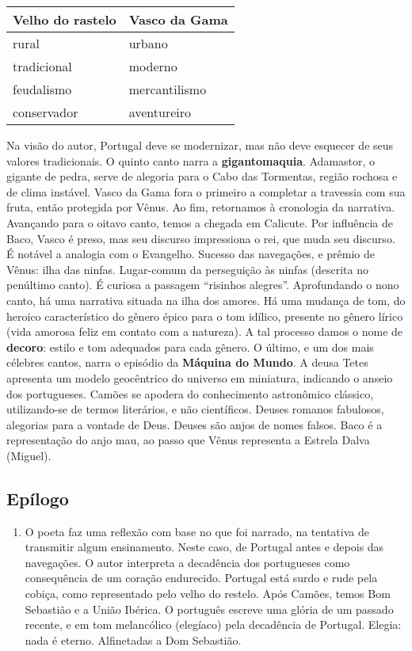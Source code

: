 \documentclass[12pt]{book}
\begin{document}
				\begin{center}
					\begin{tabular}{|M{4cm}|M{4cm}|}
					\hline
					\textbf{Velho do rastelo} & \textbf{Vasco da Gama} \\
					\hline
					rural & urbano \\
					tradicional & moderno \\
					feudalismo & mercantilismo \\
					conservador & aventureiro \\
					\hline
					\end{tabular}
				\end{center}
				\par Na visão do autor, Portugal deve se modernizar, mas não deve esquecer de seus valores tradicionais. O quinto canto narra a \textbf{gigantomaquia}. Adamastor, o gigante de pedra, serve de alegoria para o Cabo das Tormentas, região rochosa e de clima instável. Vasco da Gama fora o primeiro a completar a travessia com sua fruta, então protegida por Vênus. Ao fim, retornamos à cronologia da narrativa. Avançando para o oitavo canto, temos a chegada em Calicute. Por influência de Baco, Vasco é preso, mas seu discurso impressiona o rei, que muda seu discurso. É notável a analogia com o Evangelho. Sucesso das navegações, e prêmio de Vênus: ilha das ninfas. Lugar-comum da perseguição às ninfas (descrita no penúltimo canto). É curiosa a passagem ``risinhos alegres''. Aprofundando o nono canto, há uma narrativa situada na ilha dos amores. Há uma mudança de tom, do heroico característico do gênero épico para o tom idílico, presente no gênero lírico (vida amorosa feliz em contato com a natureza). A tal processo damos o nome de \textbf{decoro}: estilo e tom adequados para cada gênero. O último, e um dos mais célebres cantos, narra o episódio da \textbf{Máquina do Mundo}. A deusa Tetes apresenta um modelo geocêntrico do universo em miniatura, indicando o anseio dos portugueses. Camões se apodera do conhecimento astronômico clássico, utilizando-se de termos literários, e não científicos. Deuses romanos fabulosos, alegorias para a vontade de Deus. Deuses são anjos de nomes falsos. Baco é a representação do anjo mau, ao passo que Vênus representa a Estrela Dalva (Miguel).
				\subsection{Epílogo}
 				\begin{enumerate}
 					\item O poeta faz uma reflexão com base no que foi narrado, na tentativa de transmitir algum ensinamento. Neste caso, de Portugal antes e depois das navegações. O autor interpreta a decadência dos portugueses como consequência de um coração endurecido. Portugal está surdo e rude pela cobiça, como representado pelo velho do restelo. Após Camões, temos Bom Sebastião e a União Ibérica. O português escreve uma glória de um passado recente, e em tom melancólico (elegíaco) pela decadência de Portugal. Elegia: nada é eterno. Alfinetadas a Dom Sebastião. 
 				\end{enumerate}
 			
\end{document}
